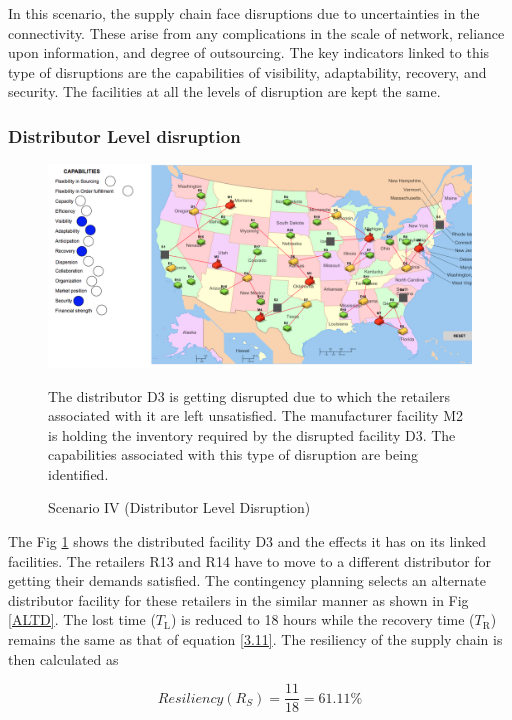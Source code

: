 In this scenario, the supply chain face disruptions due to uncertainties in the connectivity. These arise from any complications in the scale of network, reliance upon information, and degree of outsourcing. The key indicators linked to this type of disruptions are the capabilities of visibility, adaptability, recovery, and security. The facilities at all the levels of disruption are kept the same. 

\subsubsection{Distributor Level disruption}

\begin{figure}[H]
  \centering
  \includegraphics[width=6.5in]{figures/pdf/S4DLD.png}\\
  \caption{Scenario IV (Distributor Level Disruption)}
  {The distributor D3 is getting disrupted due to which the retailers associated with it are left unsatisfied. The manufacturer facility M2 is holding the inventory required by the disrupted facility D3. The capabilities associated with this type of disruption are being identified.}
  \label{S4DL}
\end{figure}   

The Fig \ref{S4DL} shows the distributed facility D3 and the effects it has on its linked facilities. The retailers R13 and R14 have to move to a different distributor for getting their demands satisfied. The contingency planning selects an alternate distributor facility for these retailers in the similar manner as shown in Fig \ref{ALTD}. The lost time ($T_{\text{L}}$) is reduced to 18 hours while the recovery time ($T_{\text{R}}$) remains the same as that of equation \ref{3.11}. The resiliency of the supply chain is then calculated as 

\begin{equation}
    Resiliency(R_S) = \frac{11}{18} = 61.11 \% \label{3.26}
\end{equation}

